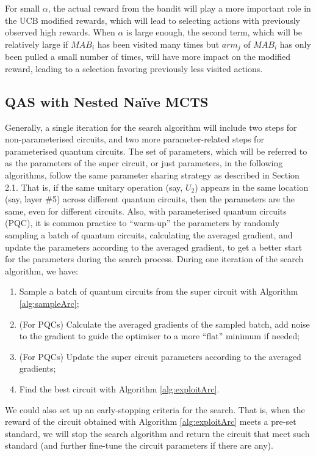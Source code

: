 \documentclass{ieeeaccess}
\begin{document}
  
  
  For small $\alpha$, the actual reward from the bandit will play a more important role in the UCB modified rewards, which will lead to selecting actions with previously observed high rewards. When $\alpha$ is large enough, the second term, which will be relatively large if $MAB_i$ has been visited many times but $arm_j$ of $MAB_i$ has only been pulled a small number of times, will have more impact on the modified reward, leading to a selection favoring previously less visited actions.

  \subsection{QAS with Nested Na\"ive MCTS}

Generally, a single iteration for the search algorithm will include two steps for non-parameterised circuits, and two more parameter-related steps for parameterised quantum circuits. The set of parameters, which will be referred to as the parameters of the super circuit, or just parameters, in the following algorithms, follow the same parameter sharing strategy as described in Section 2.1. That is, if the same unitary operation (say, $U_2$) appears in the same location (say, layer \#5) across different quantum circuits, then the parameters are the same, even for different circuits. Also, with parameterised quantum circuits (PQC), it is common practice to ``warm-up'' the parameters by randomly sampling a batch of quantum circuits, calculating the averaged gradient, and update the parameters according to the averaged gradient, to get a better start for the parameters during the search process. During one iteration of the search algorithm, we have:
\begin{enumerate}
    \item Sample a batch of quantum circuits from the super circuit with Algorithm \ref{alg:sampleArc};
    \item (For PQCs) Calculate the averaged gradients of the sampled batch, add noise to the gradient to guide the optimiser to a more ``flat'' minimum if needed;
    \item (For PQCs) Update the super circuit parameters according to the averaged gradients;
    \item Find the best circuit with Algorithm \ref{alg:exploitArc}.
\end{enumerate}

We could also set up an early-stopping criteria for the search. That is, when the reward of the circuit obtained with Algorithm \ref{alg:exploitArc} meets a pre-set standard, we will stop the search algorithm and return the circuit that meet such standard (and further fine-tune the circuit parameters if there are any).
\end{document}
